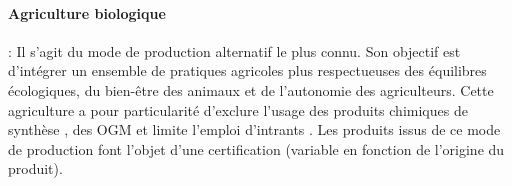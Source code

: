 \documentclass[../thesis.tex]{subfiles}
\begin{document}
    
    \paragraph{Agriculture biologique} : Il s'agit du mode de production alternatif le plus connu. Son objectif est d'intégrer un ensemble de pratiques agricoles plus respectueuses des équilibres écologiques, du bien-être des animaux et de l'autonomie des agriculteurs. Cette agriculture a pour particularité d'exclure l'usage des produits chimiques de synthèse \cite{WINTERMANTEL2020135400}, des OGM \cite{Bagnoud2020} et limite l'emploi d'intrants \cite{etter2011low}. Les produits issus de ce mode de production font l'objet d'une certification (variable en fonction de l'origine du produit).
    
    
\end{document}
